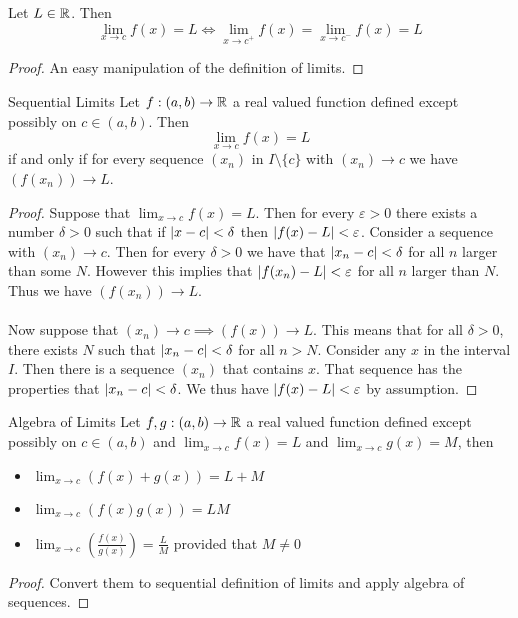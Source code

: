 \documentclass[a4paper]{article}
\begin{document}
\begin{lmm}{}{} Let $L\in\mathbb{R}$. Then $$\lim_{x\to c}f(x)=L\iff\lim_{x\to c^+}f(x)=\lim_{x\to c^-}f(x)=L$$ \tcbline
\begin{proof} An easy manipulation of the definition of limits. 
\end{proof}
\end{lmm}

\begin{thm}{Sequential Limits}{} Let $f:(a,b)\to\mathbb{R}$ a real valued function defined except possibly on $c\in(a,b)$. Then $$\lim_{x\to c}f(x)=L$$ if and only if for every sequence $(x_n)$ in $I\setminus\{c\}$ with $(x_n)\to c$ we have $(f(x_n))\to L$. \tcbline
\begin{proof} Suppose that $\lim_{x\to c}f(x)=L$. Then for every $\varepsilon>0$ there exists a number $\delta>0$ such that if $\abs{x-c}<\delta$ then $\abs{f(x)-L}<\varepsilon$. Consider a sequence with $(x_n)\to c$. Then for every $\delta>0$ we have that $\abs{x_n-c}<\delta$ for all $n$ larger than some $N$. However this implies that $\abs{f(x_n)-L}<\varepsilon$ for all $n$ larger than $N$. Thus we have $(f(x_n))\to L$. \\~\\ 
Now suppose that $(x_n)\to c\implies (f(x))\to L$. This means that for all $\delta>0$, there exists $N$ such that $\abs{x_n-c}<\delta$ for all $n>N$. Consider any $x$ in the interval $I$. Then there is a sequence $(x_n)$ that contains $x$. That sequence has the properties that $\abs{x_n-c}<\delta$. We thus have $\abs{f(x)-L}<\varepsilon$ by assumption. 
\end{proof}
\end{thm}

\begin{prp}{Algebra of Limits}{} Let $f,g:(a,b)\to\mathbb{R}$ a real valued function defined except possibly on $c\in(a,b)$ and $\lim_{x\to c}f(x)=L$ and $\lim_{x\to c}g(x)=M$, then
\begin{itemize}
\item $\lim_{x\to c}\left(f(x)+g(x)\right)=L+M$
\item $\lim_{x\to c}\left(f(x)g(x)\right)=LM$
\item $\lim_{x\to c}\left(\frac{f(x)}{g(x)}\right)=\frac{L}{M}$ provided that $M\neq 0$
\end{itemize}\tcbline
\begin{proof} Convert them to sequential definition of limits and apply algebra of sequences. 
\end{proof}
\end{prp}
\end{document}
